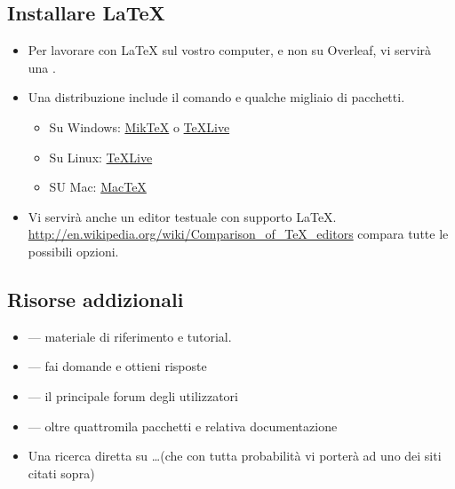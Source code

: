 \documentclass{beamer}
\begin{document}
\subsection{Installare \LaTeX{}}
\begin{frame}{\insertsubsection}
\begin{itemize}
\item Per lavorare con \LaTeX{} sul vostro computer, e non su Overleaf, vi servir\`a una .
\item Una distribuzione include il comando  
e qualche migliaio di pacchetti.
\begin{itemize}
\item Su Windows: \href{http://miktex.org/}{Mik\TeX} o \href{http://tug.org/texlive/}{\TeX Live}
\item Su Linux: \href{http://tug.org/texlive/}{\TeX Live}
\item SU Mac: \href{http://tug.org/mactex/}{Mac\TeX}
\end{itemize}
\item Vi servir\`a anche un editor testuale con supporto \LaTeX{}. \url{http://en.wikipedia.org/wiki/Comparison_of_TeX_editors} compara tutte le possibili opzioni.
\end{itemize}
\end{frame}

\subsection{Risorse addizionali}
\begin{frame}{\insertsubsection}
\begin{itemize}
\item {} ---
materiale di riferimento e tutorial.
\item{} --- fai domande e ottieni risposte
\item {} --- il principale forum degli utilizzatori
\item {} ---
oltre quattromila pacchetti e relativa documentazione
\item Una ricerca diretta su \ldots (che con tutta probabilit\`a vi porter\`a ad uno dei siti citati sopra)
\end{itemize}
\end{frame}
\end{document}

